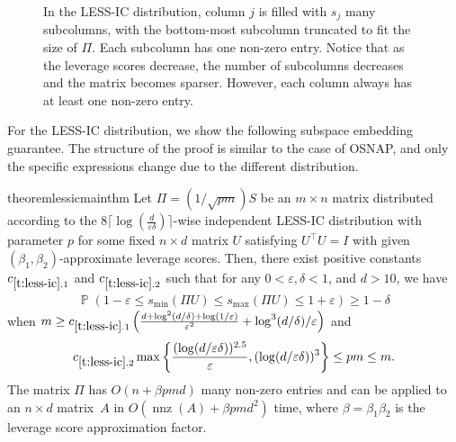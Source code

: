\documentclass[11pt]{amsart}
\numberwithin{equation}{section}
\numberwithin{equation}{section}
\DeclareMathOperator{\Pb}{\mathbb{P}}
\DeclareMathOperator{\nnz}{nnz}
\theoremstyle{remark}
\theoremstyle{definition}
\begin{document}
\begin{figure}[h!]
    \caption{In the LESS-IC distribution, column $j$ is filled with $s_j$ many subcolumns, with the bottom-most subcolumn truncated to fit the size of $\Pi$. Each subcolumn has one non-zero entry. Notice that as the leverage scores decrease, the number of subcolumns decreases and the matrix becomes sparser. However, each column always has at least one non-zero entry.}
    \label{fig:lessic}
\end{figure}


For the LESS-IC distribution, we show the following subspace embedding guarantee. The structure of the proof is similar to the case of OSNAP, and only the specific expressions change due to the different distribution.

\begin{restatable}{theorem}{lessicmainthm}
\label{t:less-ic}
    Let $\Pi = (1/\sqrt{pm}) S$ be an $m \times n$ matrix distributed according to the $8 \lceil\log (\frac{d}{\varepsilon \delta})\rceil$-wise independent  LESS-IC distribution with parameter $p$ for some fixed $n\times d$ matrix $U$ satisfying $U^\top U=I$ with given $(\beta_1, \beta_2)$-approximate leverage scores.
Then, there exist positive constants $c_{\ref*{t:less-ic}.1}$ and $c_{\ref*{t:less-ic}.2}$ such that for any $0 < \varepsilon, \delta < 1$, and $d>10$, we have 
\begin{align*}
\Pb \left( 1 - \varepsilon  \leq s_{\min}(\Pi U)   \leq s_{\max}(\Pi U) \leq 1 + \varepsilon \right) \geq 1-\delta
\end{align*}
when $m \ge c_{\ref*{t:less-ic}.1}  \left( \frac{d +  \log^2(d/\delta)+\log(1/\varepsilon)}{\varepsilon^2} + \log^3(d/\delta)/\varepsilon \right) $ and 
$$ c_{\ref*{t:less-ic}.2} \max \left \{  \frac{(\log (d/{\varepsilon\delta}))^{2.5}}{\varepsilon}, (\log (d/{\varepsilon\delta}))^{3} \right \} \le pm \le m.$$ The matrix $\Pi$ has $O(n + \beta pmd)$ many non-zero entries and can be applied to an $n\times d$ matrix~$A$ in $O(\nnz(A) + \beta pmd^2)$ time, where $\beta=\beta_1\beta_2$ is the leverage score approximation factor.
\end{restatable}
\end{document}
